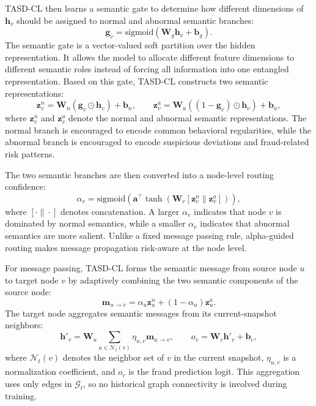 TASD-CL then learns a semantic gate to determine how different dimensions of $\mathbf{h}_v$ should be assigned to normal and abnormal semantic branches:
\begin{equation}
    \mathbf{g}_v
    =
    \mathrm{sigmoid}(\mathbf{W}_g\mathbf{h}_v+\mathbf{b}_g).
\end{equation}
The semantic gate is a vector-valued soft partition over the hidden representation. It allows the model to allocate different feature dimensions to different semantic roles instead of forcing all information into one entangled representation. Based on this gate, TASD-CL constructs two semantic representations:
\begin{equation}
    \mathbf{z}^{n}_v
    =
    \mathbf{W}_{n}(\mathbf{g}_v \odot \mathbf{h}_v)+\mathbf{b}_{n},
    \qquad
    \mathbf{z}^{a}_v
    =
    \mathbf{W}_{a}((1-\mathbf{g}_v)\odot \mathbf{h}_v)+\mathbf{b}_{a},
\end{equation}
where $\mathbf{z}^{n}_v$ and $\mathbf{z}^{a}_v$ denote the normal and abnormal semantic representations. The normal branch is encouraged to encode common behavioral regularities, while the abnormal branch is encouraged to encode suspicious deviations and fraud-related risk patterns.

The two semantic branches are then converted into a node-level routing confidence:
\begin{equation}
    \alpha_v
    =
    \mathrm{sigmoid}
    \left(
    \mathbf{a}^{\top}
    \tanh
    \left(
    \mathbf{W}_{r}[\mathbf{z}^{n}_v \| \mathbf{z}^{a}_v]
    \right)
    \right),
\end{equation}
where $[\cdot\|\cdot]$ denotes concatenation. A larger $\alpha_v$ indicates that node $v$ is dominated by normal semantics, while a smaller $\alpha_v$ indicates that abnormal semantics are more salient. Unlike a fixed message passing rule, alpha-guided routing makes message propagation risk-aware at the node level.

For message passing, TASD-CL forms the semantic message from source node $u$ to target node $v$ by adaptively combining the two semantic components of the source node:
\begin{equation}
    \mathbf{m}_{u\rightarrow v}
    =
    \alpha_u\mathbf{z}^{n}_u
    +
    (1-\alpha_u)\mathbf{z}^{a}_u .
\end{equation}
The target node aggregates semantic messages from its current-snapshot neighbors:
\begin{equation}
    \mathbf{h}'_v
    =
    \mathbf{W}_{u}
    \sum_{u\in\mathcal{N}_t(v)}
    \eta_{u,v}\mathbf{m}_{u\rightarrow v},
    \qquad
    o_v
    =
    \mathbf{W}_{c}\mathbf{h}'_v+\mathbf{b}_{c},
\end{equation}
where $\mathcal{N}_t(v)$ denotes the neighbor set of $v$ in the current snapshot, $\eta_{u,v}$ is a normalization coefficient, and $o_v$ is the fraud prediction logit. This aggregation uses only edges in $\mathcal{G}_t$, so no historical graph connectivity is involved during training.


